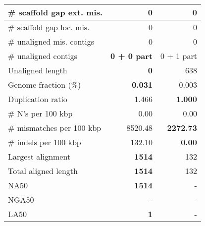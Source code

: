 \documentclass[12pt,a4paper]{article}
\begin{document}
\begin{table}[ht]
\begin{center}
\begin{tabular}{|l*{2}{|r}|}
\# scaffold gap ext. mis. & 0 & 0 \\ \hline
\# scaffold gap loc. mis. & 0 & 0 \\ \hline
\# unaligned mis. contigs & 0 & 0 \\ \hline
\# unaligned contigs & {\bf 0 + 0 part} & 0 + 1 part \\ \hline
Unaligned length & {\bf 0} & 638 \\ \hline
Genome fraction (\%) & {\bf 0.031} & 0.003 \\ \hline
Duplication ratio & 1.466 & {\bf 1.000} \\ \hline
\# N's per 100 kbp & 0.00 & 0.00 \\ \hline
\# mismatches per 100 kbp & 8520.48 & {\bf 2272.73} \\ \hline
\# indels per 100 kbp & 132.10 & {\bf 0.00} \\ \hline
Largest alignment & {\bf 1514} & 132 \\ \hline
Total aligned length & {\bf 1514} & 132 \\ \hline
NA50 & {\bf 1514} & - \\ \hline
NGA50 & - & - \\ \hline
LA50 & {\bf 1} & - \\ \hline
\end{tabular}
\end{center}
\end{table}
\end{document}
